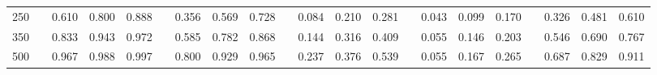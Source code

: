 % 
\begin{tabular}{ccccccccccccccccccccc}
  \hline
  \hline
250 &  & 0.610 & 0.800 & 0.888 &  & 0.356 & 0.569 & 0.728 &  & 0.084 & 0.210 & 0.281 &  & 0.043 & 0.099 & 0.170 &  & 0.326 & 0.481 & 0.610 \\ 
  350 &  & 0.833 & 0.943 & 0.972 &  & 0.585 & 0.782 & 0.868 &  & 0.144 & 0.316 & 0.409 &  & 0.055 & 0.146 & 0.203 &  & 0.546 & 0.690 & 0.767 \\ 
  500 &  & 0.967 & 0.988 & 0.997 &  & 0.800 & 0.929 & 0.965 &  & 0.237 & 0.376 & 0.539 &  & 0.055 & 0.167 & 0.265 &  & 0.687 & 0.829 & 0.911 \\ 
   \hline
\end{tabular}
